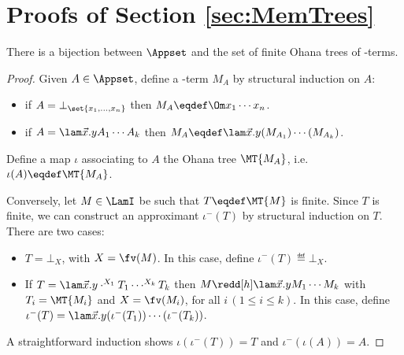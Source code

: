 
\section{Proofs of Section \ref{sec:MemTrees}}

\begin{lemma}
	There is a bijection between $\Appset$ and the set of finite Ohana 
	trees of \lamI-terms.
\end{lemma}

	\begin{proof}
	Given $A\in\Appset$, define a \lamI-term $M_A$ 
	by structural induction on $A$:
	\begin{itemize}
	\item if $A = \bot_{\set{x_1,\dots,x_n}}$ then 
		$M_A\eqdef \Om x_1\cdots x_n$.
	\item if $A = \lam\vec x.yA_1\cdots A_k$ then 
		$M_A \eqdef \lam\vec x.y(M_{A_1})\cdots (M_{A_k})$.
	\end{itemize}
	Define a map $\iota$ associating to $A$ the Ohana tree $\MT{M_A}$, 
	i.e.\ $\iota(A) \eqdef \MT{M_A}$.
	
	Conversely, let $M\in\LamI$ be such that $T\eqdef\MT{M}$ is finite. 
	Since $T$ is finite, we can construct an approximant $\iota^-(T)$ 
	by structural induction on $T$. There are two cases:
	\begin{itemize}
	\item $T = \bot_X$, with $X = \fv(M)$. 
		In this case, define $\iota^-(T) \eqdef \bot_X$.
	\item If $T = \lam\vec x.y\cdot^{X_1}T_1\cdots^{X_k} T_k$ then 
		$M\redd[h] \lam\vec x.yM_1\cdots M_k$ with $T_i = \MT{M_i}$ 
		and $X = \fv(M_i)$, for all $i\,(1\le i\le k)$. 
		In this case, define $\iota^-(T) = 
		\lam\vec x.y(\iota^-(T_1))\cdots (\iota^-(T_k))$.
	\end{itemize}
	A straightforward induction shows $\iota(\iota^-(T)) = T$ and 
	$\iota^-(\iota(A)) = A$.
	\end{proof}

